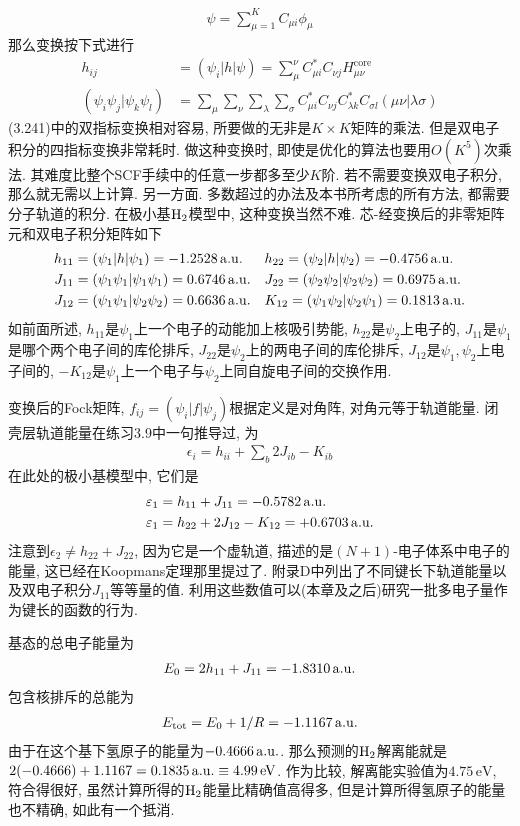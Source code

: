 \begin{align}
\psi = \sum_{\mu=1}^{K}C_{\mu i}\phi_\mu
\end{align}
那么变换按下式进行
\begin{align}
h_{ij} & = (\psi_i|h|\psi) = \sum_{\mu}^{\nu}C_{\mu i}^*C_{\nu j}H_{\mu\nu}^\mathrm{core}\\
(\psi_i\psi_j|\psi_k\psi_l) & = \sum_\mu\sum_\nu\sum_\lambda\sum_\sigma C_{\mu i}^*C_{\nu j}C_{\lambda k}^*C_{\sigma l}(\mu\nu|\lambda\sigma)
\end{align}
(3.241)中的双指标变换相对容易, 所要做的无非是$K\times K$矩阵的乘法. 但是双电子积分的四指标变换非常耗时. 做这种变换时, 即使是优化的算法也要用$O(K^5)$次乘法. 其难度比整个SCF手续中的任意一步都多至少$K$阶. 若不需要变换双电子积分, 那么就无需以上计算. 另一方面. 多数超过\hft 的办法及本书所考虑的所有方法, 都需要分子轨道的积分. 在极小基$\mathrm{H}_2$模型中, 这种变换当然不难. 芯-\ha 经变换后的非零矩阵元和双电子积分矩阵如下
\begin{align*}
h_{11}& =(\psi_1|h|\psi_1)=-1.2528\,\mathrm{a.u.} &&h_{22}=(\psi_2|h|\psi_2)=-0.4756\,\mathrm{a.u.}\\
J_{11}& =(\psi_1\psi_1|\psi_1\psi_1)=0.6746\,\mathrm{a.u.} &&J_{22}=(\psi_2\psi_2|\psi_2\psi_2)=0.6975\,\mathrm{a.u.}\\
J_{12}& =(\psi_1\psi_1|\psi_2\psi_2)=0.6636\,\mathrm{a.u.} &&K_{12}=(\psi_1\psi_2|\psi_2\psi_1)=0.1813\,\mathrm{a.u.}
\end{align*}
如前面所述, $h_{11}$是$\psi_1$上一个电子的动能加上核吸引势能, $h_{22}$是$\psi_2$上电子的, $J_{11}$是$\psi_1$是哪个两个电子间的库伦排斥, $J_{22}$是$\psi_2$上的两电子间的库伦排斥, $J_{12}$是$\psi_1,\psi_2$上电子间的, $-K_{12}$是$\psi_1$上一个电子与$\psi_2$上同自旋电子间的交换作用.

变换后的Fock矩阵, $f_{ij}=(\psi_i|f|\psi_j)$根据定义是对角阵, 对角元等于轨道能量. 闭壳层轨道能量在练习3.9中一句推导过, 为
\begin{align}
\epsilon_i = h_{ii} + \sum_b2J_{ib} -K_{ib}
\end{align}
在此处的极小基模型中, 它们是
\begin{align}
\varepsilon_1 & = h_{11} + J_{11} = -0.5782\,\mathrm{a.u.}\\
\varepsilon_1 & = h_{22} + 2J_{12} - K_{12} = +0.6703\,\mathrm{a.u.}
\end{align}
注意到$\epsilon_2\neq h_{22}+J_{22}$, 因为它是一个虚轨道, 描述的是$(N+1)$-电子体系中电子的能量, 这已经在Koopmans定理那里提过了. 附录D中列出了不同键长下轨道能量以及双电子积分$J_{11}$等等量的值. 利用这些数值可以(本章及之后)研究一批多电子量作为键长的函数的行为.

基态的总电子能量为
\begin{align}
E_0 = 2h_{11} + J_{11} = -1.8310\,\mathrm{a.u.}
\end{align}
包含核排斥的总能为
\begin{align}
E_\mathrm{tot} = E_0 + 1/R = -1.1167\,\mathrm{a.u.}
\end{align}
由于在这个基下氢原子的能量为$-0.4666\,\mathrm{a.u.}$. 那么预测的$\mathrm{H}_2$解离能就是$2(-0.4666)+1.1167=0.1835\,\mathrm{a.u.}\equiv 4.99\,\mathrm{eV}$. 作为比较, 解离能实验值为$4.75\,\mathrm{eV}$, 符合得很好, 虽然计算所得的$\mathrm{H}_2$能量比精确值高得多, 但是计算所得氢原子的能量也不精确, 如此有一个抵消.

